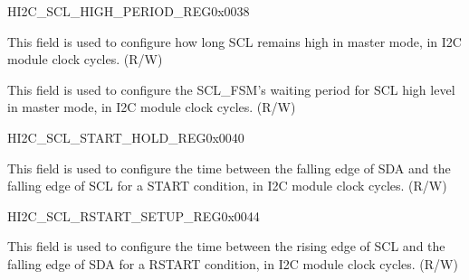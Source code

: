 \begin{register}{H}{I2C\_SCL\_HIGH\_PERIOD\_REG}{0x{}0038}\label{regdesc:I2CSCLHIGHPERIODREG}
%
%
%
\regnewline%
\begin{regdesc}\begin{reglist}
\label{fielddesc:I2CSCLHIGHPERIOD}\item [I2C\_SCL\_HIGH\_PERIOD] This field is used to configure how long SCL remains high in master mode, in I2C module clock cycles. (R/W)
\label{fielddesc:I2CSCLWAITHIGHPERIOD}\item [I2C\_SCL\_WAIT\_HIGH\_PERIOD] This field is used to configure the SCL\_FSM's waiting period for SCL high level in master mode, in I2C module clock cycles. (R/W)
\end{reglist}\end{regdesc}
\end{register}


\begin{register}{H}{I2C\_SCL\_START\_HOLD\_REG}{0x{}0040}\label{regdesc:I2CSCLSTARTHOLDREG}
%
%
\regnewline%
\begin{regdesc}\begin{reglist}
\label{fielddesc:I2CSCLSTARTHOLDTIME}\item [I2C\_SCL\_START\_HOLD\_TIME] This field is used to configure the time between the falling edge
of SDA and the falling edge of SCL for a START condition, in I2C module clock cycles. (R/W)
\end{reglist}\end{regdesc}
\end{register}


\begin{register}{H}{I2C\_SCL\_RSTART\_SETUP\_REG}{0x{}0044}\label{regdesc:I2CSCLRSTARTSETUPREG}
%
%
\regnewline%
\begin{regdesc}\begin{reglist}
\label{fielddesc:I2CSCLRSTARTSETUPTIME}\item [I2C\_SCL\_RSTART\_SETUP\_TIME] This field is used to configure the time between the rising
edge of SCL and the falling edge of SDA for a RSTART condition, in I2C module clock cycles. (R/W)
\end{reglist}\end{regdesc}
\end{register}


